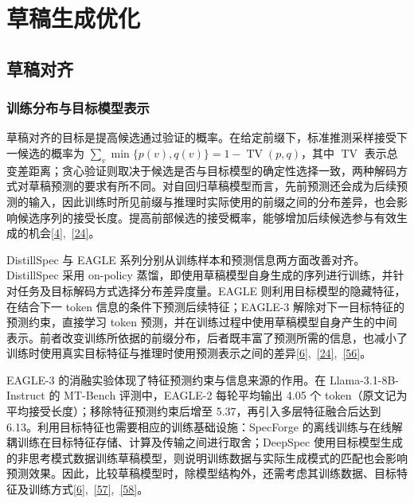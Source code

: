 \documentclass[11pt,a4paper,UTF8,fontset=none,scheme=plain,zihao=-4]{ctexart}
\begin{document}
\hypertarget{section-3}{%
\section{草稿生成优化}\label{section-3}}

\hypertarget{section-3-1}{%
\subsection{草稿对齐}\label{section-3-1}}

\hypertarget{section-3-1-1}{%
\subsubsection{训练分布与目标模型表示}\label{section-3-1-1}}

草稿对齐的目标是提高候选通过验证的概率。在给定前缀下，标准推测采样接受下一候选的概率为
\(\sum_v\min\{p(v),q(v)\}=1-\operatorname{TV}(p,q)\)，其中
\(\operatorname{TV}\)
表示总变差距离；贪心验证则取决于候选是否与目标模型的确定性选择一致，两种解码方式对草稿预测的要求有所不同。对自回归草稿模型而言，先前预测还会成为后续预测的输入，因此训练时所见前缀与推理时实际使用的前缀之间的分布差异，也会影响候选序列的接受长度。提高前部候选的接受概率，能够增加后续候选参与有效生成的机会\protect\hyperlink{ref-leviathan}{{[}4{]}},~\protect\hyperlink{ref-distillspec}{{[}24{]}}。

DistillSpec 与 EAGLE
系列分别从训练样本和预测信息两方面改善对齐。DistillSpec 采用 on-policy
蒸馏，即使用草稿模型自身生成的序列进行训练，并针对任务及目标解码方式选择分布差异度量。EAGLE
则利用目标模型的隐藏特征，在结合下一 token
信息的条件下预测后续特征；EAGLE-3 解除对下一目标特征的预测约束，直接学习
token
预测，并在训练过程中使用草稿模型自身产生的中间表示。前者改变训练所依据的前缀分布，后者既丰富了预测所需的信息，也减小了训练时使用真实目标特征与推理时使用预测表示之间的差异\protect\hyperlink{ref-eagle3}{{[}6{]}},~\protect\hyperlink{ref-distillspec}{{[}24{]}},~\protect\hyperlink{ref-eagle}{{[}56{]}}。

EAGLE-3 的消融实验体现了特征预测约束与信息来源的作用。在
Llama-3.1-8B-Instruct 的 MT-Bench 评测中，EAGLE-2 每轮平均输出 4.05 个
token（原文记为平均接受长度）；移除特征预测约束后增至
5.37，再引入多层特征融合后达到
6.13。利用目标特征也需要相应的训练基础设施：SpecForge
的离线训练与在线解耦训练在目标特征存储、计算及传输之间进行取舍；DeepSpec
使用目标模型生成的非思考模式数据训练草稿模型，则说明训练数据与实际生成模式的匹配也会影响预测效果。因此，比较草稿模型时，除模型结构外，还需考虑其训练数据、目标特征及训练方式\protect\hyperlink{ref-eagle3}{{[}6{]}},~\protect\hyperlink{ref-specforgedocs}{{[}57{]}},~\protect\hyperlink{ref-deepspecdocs}{{[}58{]}}。
\end{document}
